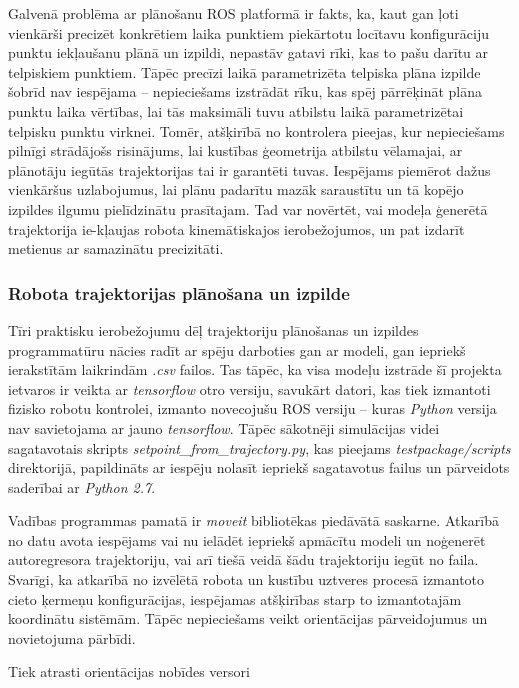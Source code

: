 \documentclass[12pt, a4paper]{article}
\numberwithin{equation}{section} %
\begin{document}
Galvenā problēma ar plānošanu ROS platformā ir fakts, ka, kaut gan ļoti vienkārši precizēt konkrētiem laika punktiem piekārtotu locītavu konfigurāciju punktu iekļaušanu plānā un izpildi, nepastāv gatavi rīki, kas to pašu darītu ar telpiskiem punktiem. Tāpēc precīzi laikā parametrizēta telpiska plāna izpilde šobrīd nav iespējama -- nepieciešams izstrādāt rīku, kas spēj pārrēķināt plāna punktu laika vērtības, lai tās maksimāli tuvu atbilstu laikā parametrizētai telpisku punktu virknei. Tomēr, atšķirībā no kontrolera pieejas, kur nepieciešams pilnīgi strādājošs risinājums, lai kustības ģeometrija atbilstu vēlamajai, ar plānotāju iegūtās trajektorijas tai ir garantēti tuvas. Iespējams piemērot dažus vienkāršus uzlabojumus, lai plānu padarītu mazāk saraustītu un tā kopējo izpildes ilgumu pielīdzinātu prasītajam. Tad var novērtēt, vai modeļa ģenerētā trajektorija ie-kļaujas robota kinemātiskajos ierobežojumos, un pat izdarīt metienus ar samazinātu precizitāti.

\subsubsection{Robota trajektorijas plānošana un izpilde}


Tīri praktisku ierobežojumu dēļ trajektoriju plānošanas un izpildes programmatūru nācies radīt ar spēju darboties gan ar modeli, gan iepriekš ierakstītām laikrindām \textit{.csv} failos. Tas tāpēc, ka visa modeļu izstrāde šī projekta ietvaros ir veikta ar \textit{tensorflow} otro versiju, savukārt datori, kas tiek izmantoti fizisko robotu kontrolei, izmanto novecojušu ROS versiju -- kuras \textit{Python} versija nav savietojama ar jauno \textit{tensorflow}. Tāpēc sākotnēji simulācijas videi sagatavotais skripts \textit{setpoint\_from\_trajectory.py}, kas pieejams \textit{testpackage/scripts} direktorijā, papildināts ar iespēju nolasīt iepriekš sagatavotus failus un pārveidots saderībai ar \textit{Python 2.7}.

Vadības programmas pamatā ir \textit{moveit} bibliotēkas piedāvātā saskarne. Atkarībā no datu avota iespējams vai nu ielādēt iepriekš apmācītu modeli un noģenerēt autoregresora trajektoriju, vai arī tiešā veidā šādu trajektoriju iegūt no faila. Svarīgi, ka atkarībā no izvēlētā robota un kustību uztveres procesā izmantoto cieto ķermeņu konfigurācijas, iespējamas atšķirības starp to izmantotajām koordinātu sistēmām. Tāpēc nepieciešams veikt orientācijas pārveidojumus un novietojuma pārbīdi.

Tiek atrasti orientācijas nobīdes versori
\end{document}
